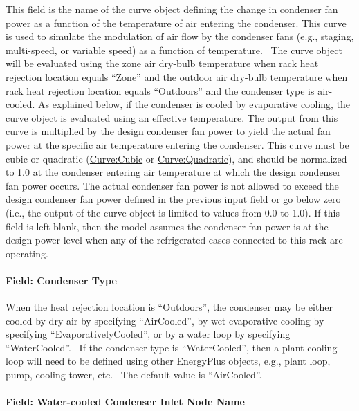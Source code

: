 This field is the name of the curve object defining the change in condenser fan power as a function of the temperature of air entering the condenser. This curve is used to simulate the modulation of air flow by the condenser fans (e.g., staging, multi-speed, or variable speed) as a function of temperature.~ The curve object will be evaluated using the zone air dry-bulb temperature when rack heat rejection location equals ``Zone'' and the outdoor air dry-bulb temperature when rack heat rejection location equals ``Outdoors'' and the condenser type is air-cooled. As explained below, if the condenser is cooled by evaporative cooling, the curve object is evaluated using an effective temperature. The output from this curve is multiplied by the design condenser fan power to yield the actual fan power at the specific air temperature entering the condenser. This curve must be cubic or quadratic (\hyperref[curvecubic]{Curve:Cubic} or \hyperref[curvequadratic]{Curve:Quadratic}), and should be normalized to 1.0 at the condenser entering air temperature at which the design condenser fan power occurs. The actual condenser fan power is not allowed to exceed the design condenser fan power defined in the previous input field or go below zero (i.e., the output of the curve object is limited to values from 0.0 to 1.0). If this field is left blank, then the model assumes the condenser fan power is at the design power level when any of the refrigerated cases connected to this rack are operating.

\paragraph{Field: Condenser Type}\label{field-condenser-type-002}

When the heat rejection location is ``Outdoors'', the condenser may be either cooled by dry air by specifying ``AirCooled'', by wet evaporative cooling by specifying ``EvaporativelyCooled'', or by a water loop by specifying ``WaterCooled''.~ If the condenser type is ``WaterCooled'', then a plant cooling loop will need to be defined using other EnergyPlus objects, e.g., plant loop, pump, cooling tower, etc.~ The default value is ``AirCooled''.

\paragraph{Field: Water-cooled Condenser Inlet Node Name}\label{field-water-cooled-condenser-inlet-node-name}

